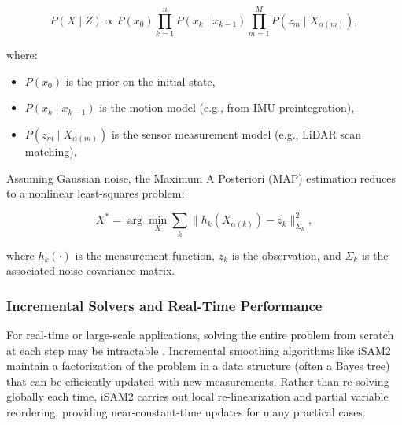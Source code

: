 \begin{equation}
P(X \mid Z) \propto P(x_0) \prod_{k=1}^n P(x_k \mid x_{k-1}) \prod_{m=1}^M P(z_m \mid X_{\alpha(m)}),
\label{eq:fg_bayes}
\end{equation}

where:
\begin{itemize}
    \item $P(x_0)$ is the prior on the initial state,
    \item $P(x_k \mid x_{k-1})$ is the motion model (e.g., from IMU preintegration),
    \item $P(z_m \mid X_{\alpha(m)})$ is the sensor measurement model (e.g., LiDAR scan matching).
\end{itemize}

Assuming Gaussian noise, the Maximum A Posteriori (MAP) estimation reduces to a nonlinear least-squares problem:

\begin{equation}
X^* = \arg\min_X \sum_k \| h_k(X_{\alpha(k)}) - z_k \|_{\Sigma_k}^2,
\label{eq:fg_map}
\end{equation}

where $h_k(\cdot)$ is the measurement function, $z_k$ is the observation, and $\Sigma_k$ is the associated noise covariance matrix.


\subsubsection{Incremental Solvers and Real-Time Performance}
For real-time or large-scale applications, solving the entire problem from scratch at each step may be intractable \cite{thrun2005probabilistic}. Incremental smoothing algorithms like iSAM2 \cite{kaess2012isam2} maintain a factorization of the problem in a data structure (often a Bayes tree) that can be efficiently updated with new measurements. Rather than re-solving globally each time, iSAM2 carries out local re-linearization and partial variable reordering, providing near-constant-time updates for many practical cases.

